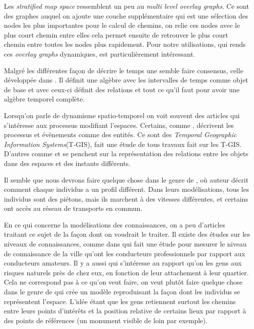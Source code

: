 \documentclass[a4paper]{article}
\begin{document}
Les \emph{stratified map space} ressemblent un peu au \emph{multi level overlay
graphs}\cite{holzer2009}. Ce sont des graphes auquel on ajoute une couche
supplémentaire qui est une sélection des nodes les plus importantes pour le
calcul de chemins, on relie ces nodes avec le plus court chemin entre elles cela
permet ensuite de retrouver le plus court chemin entre toutes les nodes plus
rapidement. Pour notre utilisations, \cite{bruera2008} qui rends ces
\emph{overlay graphs} dynamiques, est particulièrement intéressant.

Malgré les différentes façon de décrire le temps une semble faire consensus,
celle développée dans \cite{allen1985}. Il définit une algèbre avec les
intervalles de temps comme objet de base et avec ceux-ci définit des relations
et tout ce qu'il faut pour avoir une algèbre temporel complète.

Lorsqu'on parle de dynamisme spatio-temporel on voit souvent des articles qui
s'intéresse aux processus modifiant l'espaces. Certains, comme
\cite{claramunt1995}, décrivent les processus et évènements comme des entités.
Ce sont des \emph{Temporal Geographic Information Systems}(T-GIS),
\cite{siabato2018} fait une étude de tous travaux fait sur les T-GIS. D'autres
comme \cite{delmondo2011} et \cite{costes2015} se penchent sur la représentation
des relations entre les objets dans des espaces et des instants différents.

Il semble que nous devrons faire quelque chose dans le genre de
\cite{jguirim2015}, où auteur décrit comment chaque individus a un profil
différent. Dans leurs modélisations, tous les individus sont des piétons, mais
ils marchent à des vitesses différentes, et certains ont accès au réseau de
transports en commun.

En ce qui concerne la modélisations des connaissances, on a peu d'articles
traitant ce sujet de la façon dont on voudrait le traiter. Il existe des études
sur les niveaux de connaissances, comme dans \cite{stern1988} qui fait une étude
pour mesurer le niveau de connaissance de la ville qu'ont les conducteurs
professionnels par rapport aux conducteurs amateurs. Il y a aussi
\cite{quinn2018} qui s'intéresse au rapport qu'on les gens aux risques naturels
près de chez eux, en fonction de leur attachement à leur quartier. Cela ne
correspond pas à ce qu'on veut faire, on veut plutôt faire quelque chose dans le
genre de \cite{kuipers1978} qui crée un modèle reproduisant la façon dont les
individus se représentent l'espace. L'idée étant que les gens retiennent surtout
les chemins entre leurs points d'intérêts et la position relative de certains
lieux par rapport à des points de références (un monument visible de loin par
exemple).
\end{document}
